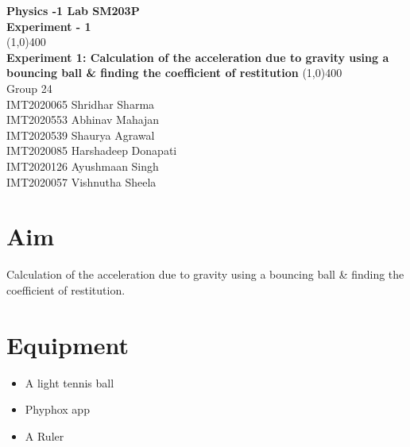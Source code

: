 \documentclass{article}
\begin{document}
\begin{sloppypar}
\begin{titlepage}
\begin{center}
\vspace*{0.5cm}
\LARGE{\textbf{Physics -1 Lab SM203P}}\\
\Large{\textbf{Experiment - 1}}\\
\vfill
\line(1,0){400}\\[1mm]
\vspace{10mm}
\Large{\textbf{Experiment 1: Calculation of the acceleration due to gravity using a bouncing ball \& finding the coefficient of restitution}}
\vspace{10mm}
\line(1,0){400}\\[1mm]
\vfill
Group 24 \\
IMT2020065 Shridhar Sharma  \\
IMT2020553 Abhinav Mahajan  \\
IMT2020539 Shaurya Agrawal \\
IMT2020085 Harshadeep Donapati \\
IMT2020126 Ayushmaan Singh \\
IMT2020057 Vishnutha Sheela \\
\end{center}
\end{titlepage}


\section{Aim}
Calculation of the acceleration due to gravity using a
bouncing ball \& finding the coefficient of restitution.
\section{Equipment}
\begin{itemize}
\item A light tennis ball
\item Phyphox app
\item A Ruler
\end{itemize}


\end{sloppypar}
\end{document}
